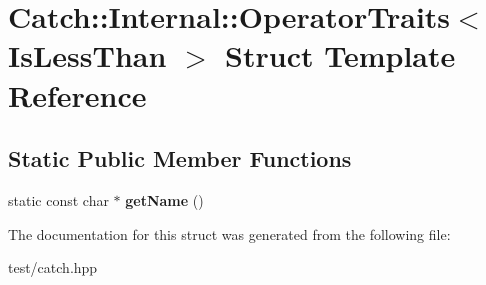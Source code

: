 \hypertarget{structCatch_1_1Internal_1_1OperatorTraits_3_01IsLessThan_01_4}{}\section{Catch\+:\+:Internal\+:\+:Operator\+Traits$<$ Is\+Less\+Than $>$ Struct Template Reference}
\label{structCatch_1_1Internal_1_1OperatorTraits_3_01IsLessThan_01_4}
\subsection*{Static Public Member Functions}
\begin{DoxyCompactItemize}
\item 
static const char $\ast$ {\bfseries get\+Name} ()\hypertarget{structCatch_1_1Internal_1_1OperatorTraits_3_01IsLessThan_01_4_aa3b536ddbd2e34b1253931ff00c32712}{}\label{structCatch_1_1Internal_1_1OperatorTraits_3_01IsLessThan_01_4_aa3b536ddbd2e34b1253931ff00c32712}

\end{DoxyCompactItemize}


The documentation for this struct was generated from the following file\+:\begin{DoxyCompactItemize}
\item 
test/catch.\+hpp\end{DoxyCompactItemize}
